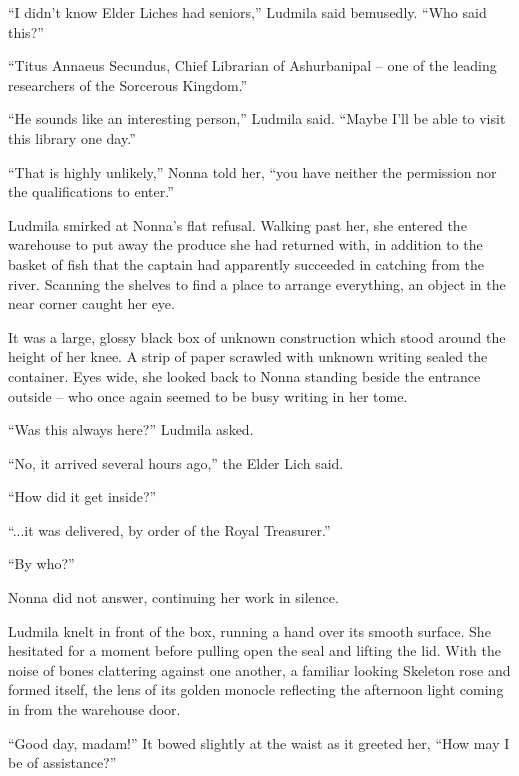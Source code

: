  

“I didn’t know Elder Liches had seniors,” Ludmila said bemusedly. “Who said this?”

 

“Titus Annaeus Secundus, Chief Librarian of Ashurbanipal – one of the leading researchers of the Sorcerous Kingdom.”

 

“He sounds like an interesting person,” Ludmila said. “Maybe I’ll be able to visit this library one day.”

 

“That is highly unlikely,” Nonna told her, “you have neither the permission nor the qualifications to enter.”

 

Ludmila smirked at Nonna’s flat refusal. Walking past her, she entered the warehouse to put away the produce she had returned with, in addition to the basket of fish that the captain had apparently succeeded in catching from the river. Scanning the shelves to find a place to arrange everything, an object in the near corner caught her eye.

 

It was a large, glossy black box of unknown construction which stood around the height of her knee. A strip of paper scrawled with unknown writing sealed the container. Eyes wide, she looked back to Nonna standing beside the entrance outside – who once again seemed to be busy writing in her tome.

 

“Was this always here?” Ludmila asked.

 

“No, it arrived several hours ago,” the Elder Lich said.

 

“How did it get inside?”

 

“...it was delivered, by order of the Royal Treasurer.”

 

“By who?”

 

Nonna did not answer, continuing her work in silence.

 

Ludmila knelt in front of the box, running a hand over its smooth surface. She hesitated for a moment before pulling open the seal and lifting the lid. With the noise of bones clattering against one another, a familiar looking Skeleton rose and formed itself, the lens of its golden monocle reflecting the afternoon light coming in from the warehouse door.

 

“Good day, madam!” It bowed slightly at the waist as it greeted her, “How may I be of assistance?”